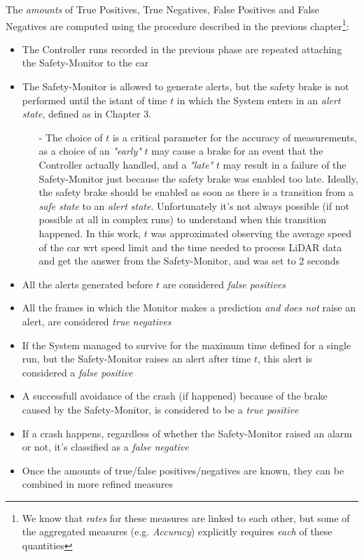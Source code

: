 The \textsl{amounts} of True Positives, True Negatives, False Positives and False Negatives are computed using the procedure described in the previous chapter\footnote{We know that \textsl{rates} for these measures are linked to each other, but some of the aggregated measures (e.g.  \textsl{Accuracy}) explicitly requires \textsl{each} of these quantities}:

\begin{itemize}
	\item The Controller runs recorded in the previous phase are repeated attaching the Safety-Monitor to the car
	\item The Safety-Monitor is allowed to generate alerts, but the safety brake is not performed until the istant of time $t$ in which the System enters in an \textsl{alert state}, defined as in Chapter 3.
	\begin{itemize}
		\item[-] The choice of $t$ is a critical parameter for the accuracy of measurements, as a choice of an \textsl{"early"} $t$ may cause a brake for an event that the Controller actually handled, and a \textsl{"late"} $t$ may result in a failure of the Safety-Monitor just because the safety brake was enabled too late. Ideally, the safety brake should be enabled as soon as there is a transition from a \textsl{safe state} to an \textsl{alert state}. Unfortunately it's not always possible (if not possible at all in complex runs) to understand when this transition happened. In this work, $t$ was approximated observing the average speed of the car wrt speed limit and the time needed to process LiDAR data and get the answer from the Safety-Monitor, and was set to 2 seconds
	\end{itemize}
	\item All the alerts generated before $t$ are considered \textsl{false positives}
	\item All the frames in which the Monitor makes a prediction \textsl{and does not} raise an alert, are considered \textsl{true negatives} 
	\item If the System managed to survive for the maximum time defined for a single run, but the Safety-Monitor raises an alert after time $t$, this alert is considered a \textsl{false positive}
	\item A successfull avoidance of the crash (if happened) because of the brake caused by the Safety-Monitor, is considered to be a \textsl{true positive}
	\item If a crash happens, regardless of whether the Safety-Monitor raised an alarm or not, it's classified as a \textsl{false negative}
	\item Once the amounts of true/false positives/negatives are known, they can be combined in more refined measures
\end{itemize}

